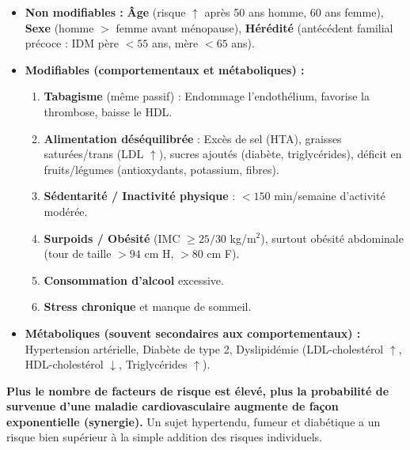 \documentclass[11pt]{article}
\begin{document}
\begin{propriete}
\begin{itemize}
    \item \textbf{Non modifiables :} \textbf{Âge} (risque $\uparrow$ après 50 ans homme, 60 ans femme), \textbf{Sexe} (homme $>$ femme avant ménopause), \textbf{Hérédité} (antécédent familial précoce : IDM père $< 55$ ans, mère $< 65$ ans).
    \item \textbf{Modifiables (comportementaux et métaboliques) :}
    \begin{enumerate}
        \item \textbf{Tabagisme} (même passif) : Endommage l'endothélium, favorise la thrombose, baisse le HDL.
        \item \textbf{Alimentation déséquilibrée} : Excès de sel (HTA), graisses saturées/trans (LDL $\uparrow$), sucres ajoutés (diabète, triglycérides), déficit en fruits/légumes (antioxydants, potassium, fibres).
        \item \textbf{Sédentarité / Inactivité physique} : $< 150$ min/semaine d'activité modérée.
        \item \textbf{Surpoids / Obésité} (IMC $\ge 25 / 30$ kg/m$^2$), surtout obésité abdominale (tour de taille $> 94$ cm H, $> 80$ cm F).
        \item \textbf{Consommation d'alcool} excessive.
        \item \textbf{Stress chronique} et manque de sommeil.
    \end{enumerate}
    \item \textbf{Métaboliques (souvent secondaires aux comportementaux) :} Hypertension artérielle, Diabète de type 2, Dyslipidémie (LDL-cholestérol $\uparrow$, HDL-cholestérol $\downarrow$, Triglycérides $\uparrow$).
\end{itemize}
\end{propriete}

\begin{propriete}
\textbf{Plus le nombre de facteurs de risque est élevé, plus la probabilité de survenue d'une maladie cardiovasculaire augmente de façon exponentielle (synergie).} Un sujet hypertendu, fumeur et diabétique a un risque bien supérieur à la simple addition des risques individuels.
\end{propriete}
\end{document}
